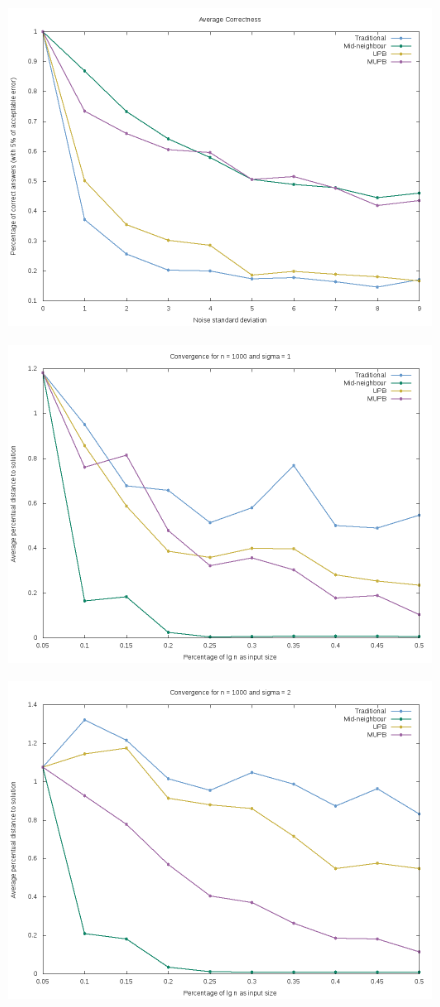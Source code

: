 \documentclass[12pt]{article}
\begin{document}
\begin{figure}[H]
        \centering
        \includegraphics[scale=.5]{correctness_plot_result}
\end{figure}
\begin{figure}[H]
        \centering
        \includegraphics[scale=.5]{convergence_plot_n1000_s1}
\end{figure}
\begin{figure}[H]
        \centering
        \includegraphics[scale=.5]{convergence_plot_n1000_s2}
\end{figure}
\end{document}
